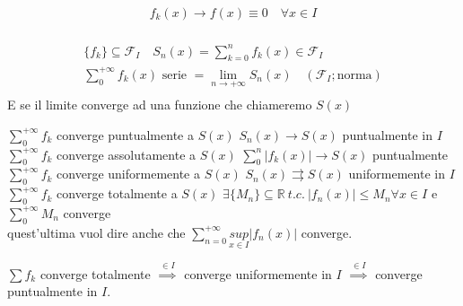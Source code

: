 \documentclass[a4paper, oneside]{article}
\begin{document}
\begin{observation}
    \begin{gather*}
      f_k(x) \to f(x) \equiv 0 \quad \forall x \in I\\
    \end{gather*}
\end{observation}


\begin{definition}
  \begin{gather*}
    \{f_k\} \subseteq \mathcal{F}_I \quad S_n(x) = \sum_{k=0}^n f_k(x) \in \mathcal{F}_I\\
    \sum_0^{+\infty} f_k(x) \text{ serie } = \lim_{n \to +\infty} S_n(x) \quad (\mathcal{F}_I; \text{norma}) \\
  \end{gather*}
  E se il limite converge ad una funzione che chiameremo $S(x)$
\end{definition}


\begin{definition}
  $\sum_0^{+\infty} f_k$ converge puntualmente a $S(x)$  $S_n(x) \to S(x)$ puntualmente in $I$\\
  $\sum_0^{+\infty} f_k$ converge assolutamente a $S(x)$  $\sum_0^n |f_k(x)| \to S(x)$ puntualmente\\
  $\sum_0^{+\infty} f_k$ converge uniformemente a $S(x)$  $S_n(x) \rightrightarrows S(x)$ uniformemente in $I$\\
  $\sum_0^{+\infty} f_k$ converge totalmente a $S(x)$  $\exists \{M_n\} \subseteq \mathbb{R} \ t.c. \ |f_n(x)| \leq M_n \forall x \in I$ e $\sum_0^{+\infty} M_n$ converge\\
  quest'ultima vuol dire anche che $\sum_{n=0}^{+\infty} \underset{x \in I}{sup} |f_n(x)|$ converge.
\end{definition}


\begin{theorem}
  $\sum f_k$ converge totalmente $ \overset{\in I}{\implies}$ converge uniformemente in $I$ $\overset{\in I}{\implies}$ converge puntualmente in $I$.
\end{theorem}
\hfill\\
\end{document}
